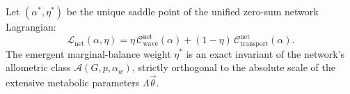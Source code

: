 \begin{theorem}
\label{thm:arch}
Let $(\alpha^*, \eta^*)$ be the unique saddle point of the unified zero-sum
network Lagrangian:
\begin{equation}
    \mathcal{L}_{\mathrm{net}}(\alpha, \eta) =
    \eta\,\mathcal{C}_{\mathrm{wave}}^{\mathrm{net}}(\alpha)
    + (1-\eta)\,\mathcal{C}_{\mathrm{transport}}^{\mathrm{net}}(\alpha).
    \label{eq:lagrangian_net}
\end{equation}
The emergent marginal-balance weight $\eta^*$ is an exact invariant of the
network's allometric class $\mathcal{A}(G, p, \alpha_w)$, strictly orthogonal to
the absolute scale of the extensive metabolic parameters $\Lambda\vec{\theta}$.
\end{theorem}


